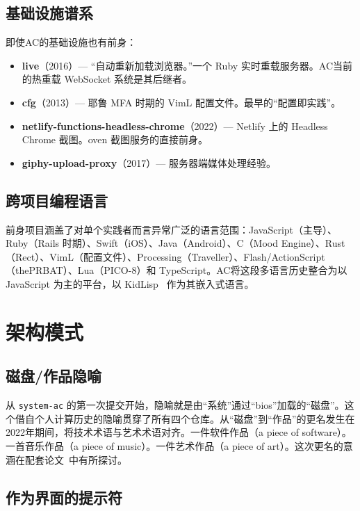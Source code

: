 \documentclass[10pt,letterpaper,twocolumn]{article}
\begin{document}
\subsection{基础设施谱系}

即使AC的基础设施也有前身：

\begin{itemize}
  \item \textbf{live}（2016）--- ``自动重新加载浏览器。''一个 Ruby 实时重载服务器。AC当前的热重载 WebSocket 系统是其后继者。
  \item \textbf{cfg}（2013）--- 耶鲁 MFA 时期的 VimL 配置文件。最早的``配置即实践''。
  \item \textbf{netlify-functions-headless-chrome}（2022）--- Netlify 上的 Headless Chrome 截图。oven 截图服务的直接前身。
  \item \textbf{giphy-upload-proxy}（2017）--- 服务器端媒体处理经验。
\end{itemize}

\subsection{跨项目编程语言}

前身项目涵盖了对单个实践者而言异常广泛的语言范围：JavaScript（主导）、Ruby（Rails 时期）、Swift（iOS）、Java（Android）、C（Mood Engine）、Rust（Rect）、VimL（配置文件）、Processing（Traveller）、Flash/ActionScript（thePRBAT）、Lua（PICO-8）和 TypeScript。AC将这段多语言历史整合为以 JavaScript 为主的平台，以 KidLisp~\citep{scudder2026kidlisp} 作为其嵌入式语言。


\section{架构模式}

\subsection{磁盘/作品隐喻}

从 \texttt{system-ac} 的第一次提交开始，隐喻就是由``系统''通过``bios''加载的``磁盘''。这个借自个人计算历史的隐喻贯穿了所有四个仓库。从``磁盘''到``作品''的更名发生在2022年期间，将技术术语与艺术术语对齐。一件软件作品（a piece of software）。一首音乐作品（a piece of music）。一件艺术作品（a piece of art）。这次更名的意涵在配套论文~\citep{scudder2026pieces}中有所探讨。

\subsection{作为界面的提示符}
\end{document}
